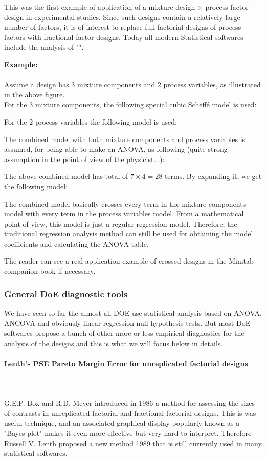 	This was the first example of application of a mixture design $\times$ process factor design in experimental studies. Since such designs contain a relatively large number of factors, it is of interest to replace full factorial designs of process factors with fractional factor designs. Today all modern Statistical softwares include the analysis of "".
	\begin{tcolorbox}[colframe=black,colback=white,sharp corners]
	\textbf{{\Large {}}Example:}\\\\
	Assume a design has $3$ mixture components and $2$ process variables, as illustrated in the above figure.\\
	
	For the $3$ mixture components, the following special cubic Scheffé model is used:
	
	For the $2$ process variables the following model is used:
	
	The combined model with both mixture components and process variables is assumed, for being able to make an ANOVA, as following (quite strong assumption in the point of view of the physicist...):
	
	The above combined model has total of $7\times 4=28$ terms. By expanding it, we get the following model:
	
	The combined model basically crosses every term in the mixture components model with every term in the process variables model. From a mathematical point of view, this model is just a regular regression model. Therefore, the traditional regression analysis method can still be used for obtaining the model coefficients and calculating the ANOVA table.
	\end{tcolorbox}
	The reader can see a real application example of crossed designs in the Minitab companion book if necessary.
	
	\pagebreak
	\pagebreak
	\subsubsection{General DoE diagnostic tools}
	We have seen so far the almost all DOE use statistical analysis based on ANOVA, ANCOVA and obviously linear regression null hypothesis tests. But most DoE softwares propose a bunch of other more or less empirical diagnostics for the analysis of the designs and this is what we will focus below in details.
	
	\paragraph{Lenth's PSE Pareto Margin Error for unreplicated factorial designs}\mbox{}\\\\
	G.E.P. Box and R.D. Meyer introduced in 1986 a method for assessing the sizes of contrasts in unreplicated factorial and fractional factorial designs. This is was useful technique, and an associated graphical display popularly known as a "Bayes plot" makes it even more effective but very hard to interpret. Therefore Russell V. Lenth proposed a new method 1989 that is still currently used in many statistical softwares.
	
